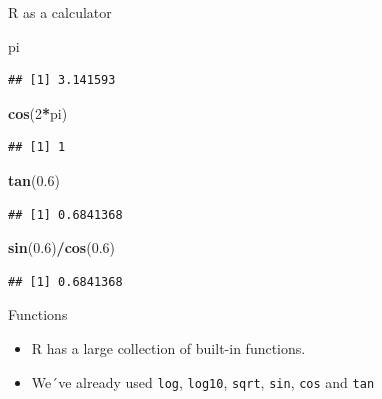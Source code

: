 \documentclass[ignorenonframetext,]{beamer}
\newenvironment{Shaded}{\begin{snugshade}}{\end{snugshade}}
\newcommand{\DecValTok}[1]{\textcolor[rgb]{0.00,0.00,0.81}{#1}}
\newcommand{\FloatTok}[1]{\textcolor[rgb]{0.00,0.00,0.81}{#1}}
\newcommand{\KeywordTok}[1]{\textcolor[rgb]{0.13,0.29,0.53}{\textbf{#1}}}
\newcommand{\NormalTok}[1]{#1}
\newcommand{\OperatorTok}[1]{\textcolor[rgb]{0.81,0.36,0.00}{\textbf{#1}}}
\begin{document}
\begin{frame}[fragile]{R as a calculator}
\protect\hypertarget{r-as-a-calculator-4}{}

\begin{Shaded}
\begin{Highlighting}[]
\NormalTok{pi}
\end{Highlighting}
\end{Shaded}

\begin{verbatim}
## [1] 3.141593
\end{verbatim}

\begin{Shaded}
\begin{Highlighting}[]
\KeywordTok{cos}\NormalTok{(}\DecValTok{2}\OperatorTok{*}\NormalTok{pi)}
\end{Highlighting}
\end{Shaded}

\begin{verbatim}
## [1] 1
\end{verbatim}

\begin{Shaded}
\begin{Highlighting}[]
\KeywordTok{tan}\NormalTok{(}\FloatTok{0.6}\NormalTok{)}
\end{Highlighting}
\end{Shaded}

\begin{verbatim}
## [1] 0.6841368
\end{verbatim}

\begin{Shaded}
\begin{Highlighting}[]
\KeywordTok{sin}\NormalTok{(}\FloatTok{0.6}\NormalTok{)}\OperatorTok{/}\KeywordTok{cos}\NormalTok{(}\FloatTok{0.6}\NormalTok{)}
\end{Highlighting}
\end{Shaded}

\begin{verbatim}
## [1] 0.6841368
\end{verbatim}

\end{frame}

\begin{frame}[fragile]{Functions}
\protect\hypertarget{functions}{}

\begin{itemize}
\item
  R has a large collection of built-in functions.
\item
  We´ve already used \texttt{log}, \texttt{log10}, \texttt{sqrt},
  \texttt{sin}, \texttt{cos} and \texttt{tan}
\end{itemize}

\end{frame}
\end{document}
